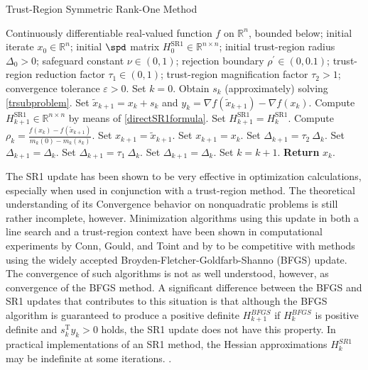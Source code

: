 \begin{algorithm}[H]
    \caption{Trust-Region Symmetric Rank-One Method}\label{TR-SR1Method}
    \begin{algorithmic}[1]
        \State Continuously differentiable real-valued function $f$ on $\mathbb{R}^n$, bounded below; initial iterate $x_0 \in \mathbb{R}^n$; initial $\spd$ matrix $H^{\mathrm{SR1}}_0 \in \mathbb{R}^{n \times n}$; initial trust-region radius $\Delta_0 > 0$; safeguard constant $\nu \in (0,1)$; rejection boundary $\rho^{\prime} \in (0, 0.1)$; trust-region reduction factor $\tau_1 \in (0,1)$; trust-region magnification factor $\tau_2 > 1$; convergence tolerance $\varepsilon > 0$. Set $k = 0$.
            \State Obtain $s_k$ (approximately) solving \cref{trsubproblem}.
            \State Set $\widetilde{x}_{k+1} = x_k + s_k$ and $y_k = \nabla f(\widetilde{x}_{k+1}) - \nabla f(x_k)$.
                \State Compute $H^{\mathrm{SR1}}_{k+1} \in \mathbb{R}^{n \times n}$ by means of \cref{directSR1formula}.
			\Else 
				\State Set $H^{\mathrm{SR1}}_{k+1} = H^{\mathrm{SR1}}_k$.
            \EndIf 
            \State Compute $\rho_k = \frac{f(x_k) - f(\widetilde{x}_{k+1})}{m_k(0) - m_k(s_k)}$.
                \State Set $x_{k+1} = \widetilde{x}_{k+1}$.
			\Else 
				\State Set $x_{k+1} = x_k$.
            \EndIf 
                    \State Set $\Delta_{k+1} = \tau_2 \ \Delta_k$.
                \Else 
                    \State Set $\Delta_{k+1} = \Delta_k$.
                \EndIf 
			\Else 
                    \State Set $\Delta_{k+1} = \tau_1 \ \Delta_k$.
                \Else 
                    \State Set $\Delta_{k+1} = \Delta_k$.
                \EndIf 
            \EndIf 
            \State Set $k = k+1$.
        \EndWhile
        \State \textbf{Return} $x_k$.
    \end{algorithmic}
\end{algorithm}

The SR1 update has been shown to be very effective in optimization calculations, especially when used in conjunction with a trust-region method. The theoretical understanding of its Convergence behavior on nonquadratic problems is still rather incomplete, however. Minimization algorithms using this update in both a line search and a trust-region context have been shown in computational experiments by Conn, Gould, and Toint and by to be competitive with methods using the widely accepted Broyden-Fletcher-Goldfarb-Shanno (BFGS) update. The convergence of such algorithms is not as well understood, however, as convergence of the BFGS method. A significant difference between the BFGS and SR1 updates that contributes to this situation is that although the BFGS algorithm is guaranteed to produce a positive definite $H^{BFGS}_{k+1}$ if $H^{BFGS}_k$ is positive definite and $s^{\mathrm{T}}_k y_k > 0$ holds, the SR1 update does not have this property. In practical implementations of an SR1 method, the Hessian approximations $H^{SR1}_k$ may be indefinite at some iterations. \cite[p.~1025-1026]{ByrdKhalfanSchnabel:1996}. 

